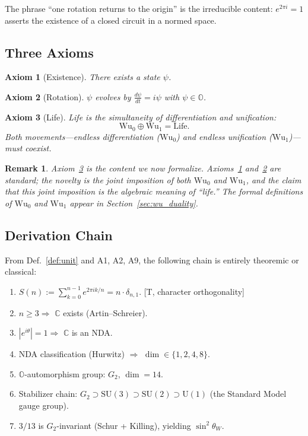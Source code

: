 \documentclass[11pt, a4paper]{article}
\newtheorem{axiom}{Axiom}
\newtheorem*{remark}{Remark}
\newcommand{\C}{\mathbb{C}}
\newcommand{\Oct}{\mathbb{O}}
\newcommand{\Wuz}{\mathrm{Wu}_0}
\newcommand{\Wuo}{\mathrm{Wu}_1}
\begin{document}
The phrase ``one rotation returns to the origin'' is the irreducible
content: $e^{2\pi i} = 1$ asserts the existence of a closed circuit
in a normed space.

\subsection{Three Axioms}

\begin{axiom}[Existence]
\label{ax:A1}
There exists a state $\psi$.
\end{axiom}

\begin{axiom}[Rotation]
\label{ax:A2}
$\psi$ evolves by $\displaystyle \frac{d\psi}{dt} = i\psi$ with
$\psi \in \Oct$.
\end{axiom}

\begin{axiom}[Life]
\label{ax:A9}
Life is the simultaneity of differentiation and unification:
\begin{equation}
\Wuz \oplus \Wuo = \mathrm{Life}.
\end{equation}
Both movements---endless differentiation ($\Wuz$) and endless
unification ($\Wuo$)---must coexist.
\end{axiom}

\begin{remark}
Axiom~\ref{ax:A9} is the content we now formalize. Axioms~\ref{ax:A1}
and~\ref{ax:A2} are standard; the novelty is the \emph{joint}
imposition of both $\Wuz$ and $\Wuo$, and the claim that this
joint imposition is the algebraic meaning of ``life.''
The formal definitions of $\Wuz$ and $\Wuo$ appear in
Section~\ref{sec:wu_duality}.
\end{remark}

\subsection{Derivation Chain}

From Def.~\ref{def:unit} and A1, A2, A9, the following chain is
entirely theoremic or classical:
\begin{enumerate}[nosep,label=\textbf{(\arabic*)}]
\item $S(n) := \sum_{k=0}^{n-1} e^{2\pi i k/n} = n \cdot \delta_{n,1}$.
[T, character orthogonality]
\item $n \geq 3 \Rightarrow$ $\C$ exists (Artin--Schreier).
\item $|e^{i\theta}| = 1 \Rightarrow$ $\C$ is an NDA.
\item NDA classification (Hurwitz) $\Rightarrow$ $\dim \in \{1,2,4,8\}$.
\item $\Oct$-automorphism group: $G_2$, $\dim = 14$.
\item Stabilizer chain: $G_2 \supset \mathrm{SU}(3) \supset \mathrm{SU}(2)
\supset \mathrm{U}(1)$ (the Standard Model gauge group).
\item $3/13$ is $G_2$-invariant (Schur + Killing), yielding
$\sin^2\theta_W$.
\end{enumerate}
\end{document}
